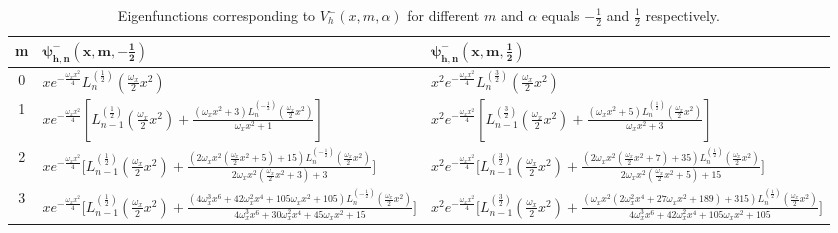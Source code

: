 \documentclass[12pt]{article}
\numberwithin{equation}{section} %
\begin{document}
\begin{table}[htp]
    \centering
    \renewcommand{\arraystretch}{1.5} %
    \setlength{\tabcolsep}{1.5em} %
    \begin{tabularx}{\columnwidth}{|c|X|X|}
    \toprule
    {\bf m} &$\mathbf{\psi_{h,n}^-(x,m,-\frac{1}{2})}$&$\mathbf{\psi_{h,n}^-(x,m,\frac{1}{2})}$\\
    \toprule
    0 & $x e^{-\frac{\omega_x  x^2}{4}}L_{n}^{(\frac{1}{2})}\left(\frac{\omega_x}{2} x^2\right) $&$x^2 e^{-\frac{\omega_x  x^2}{4}}L_{n}^{(\frac{3}{2})}\left(\frac{\omega_x}{2} x^2\right)$\\
    \bottomrule
    1 &$x e^{-\frac{\omega_x  x^2}{4}}\left[L_{n-1}^{(\frac{1}{2})}\left( \frac{\omega_x}{2}x^2 \right)+\frac{\left(\omega_x  x^2+3\right) L_n^{(-\frac{1}{2})}\left( \frac{\omega_x}{2}x^2 \right)}{\omega_x  x^2+1} \right]$&$x^2 e^{-\frac{\omega_x  x^2}{4}}\left[L_{n-1}^{(\frac{3}{2})}\left( \frac{\omega_x}{2}x^2 \right)+\frac{\left(\omega_x  x^2+5\right) L_n^{(\frac{1}{2})}\left( \frac{\omega_x}{2}x^2 \right)}{\omega_x  x^2+3}\right] $\\
    \bottomrule
    2 &$x e^{-\frac{\omega_x  x^2}{4}}\Bigg[L_{n-1}^{(\frac{1}{2})}\left( \frac{\omega_x}{2}x^2 \right)+\frac{\left(2\omega_x  x^2 \left(\frac{\omega_x}{2} x^2+5\right)+15\right) L_n^{(-\frac{1}{2})}\left( \frac{\omega_x}{2}x^2 \right)}{2\omega_x  x^2 \left(\frac{\omega_x}{2} x^2+3\right)+3}\Bigg]$ &$x^2 e^{-\frac{\omega_x  x^2}{4}}\Bigg[L_{n-1}^{(\frac{3}{2})}\left( \frac{\omega_x}{2}x^2 \right)+\frac{\left(2\omega_x  x^2 \left(\frac{\omega_x}{2} x^2+7\right)+35\right) L_n^{(\frac{1}{2})}\left( \frac{\omega_x}{2}x^2 \right)}{2\omega_x  x^2 \left(\frac{\omega_x}{2} x^2+5\right)+15}\Bigg]$\\
    \bottomrule
    3 &$x e^{-\frac{\omega_x  x^2}{4}}\Bigg[L_{n-1}^{(\frac{1}{2})}\left( \frac{\omega_x}{2}x^2 \right)+\frac{\left(4\omega_x ^3 x^6+42\omega_x ^2 x^4+105\omega_x  x^2+105\right) L_n^{(-\frac{1}{2})}\left( \frac{\omega_x}{2}x^2 \right)}{4\omega_x ^3 x^6+30\omega_x ^2 x^4+45\omega_x  x^2+15}\Bigg]$ &$x^2 e^{-\frac{\omega_x  x^2}{4}}\Bigg[L_{n-1}^{(\frac{3}{2})}\left( \frac{\omega_x}{2}x^2 \right)+\frac{\left(\omega_x  x^2 \left(2\omega_x ^2 x^4+27\omega_x  x^2+189\right)+315\right) L_n^{(\frac{1}{2})}\left( \frac{\omega_x}{2}x^2 \right)}{4\omega_x ^3 x^6+42\omega_x ^2 x^4+105\omega_x  x^2+105}\Bigg]$\\
    \bottomrule
\end{tabularx}
\caption{Eigenfunctions corresponding to $V_h^-(x,m,\alpha)$ for different $m$ and $\alpha$ equals $-\frac{1}{2}$ and $\frac{1}{2}$ respectively.}
\label{psih-1D-table}
\end{table}
\end{document}
